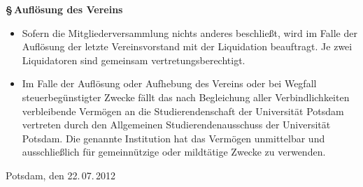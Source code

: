 \documentclass[11pt]{article}
\def\items#1{{%
  \itcounter0%
  \begin{itemize}
  #1
  \end{itemize}
}}
\let\it\item%
\def\item{
  \advance\itcounter1%
  \it[(\the\itcounter)]
}
\def\paragraf#1{
  \advance\itcounter1%
  \par\medskip
  {\large\bfseries \S\,\the\itcounter\quad#1}
  \par\smallskip
}
\begin{document}
\paragraf{Aufl{\"o}sung des Vereins}

\items{
   \item
     Sofern die Mitgliederversammlung nichts anderes beschlie{\ss}t, wird im Falle der Aufl{\"o}sung
     der letzte Vereinsvorstand mit der Liquidation beauftragt. Je zwei Liquidatoren sind
     gemeinsam vertretungsberechtigt.
   \item
     Im Falle der Aufl{\"o}sung oder Aufhebung des Vereins oder bei Wegfall steuerbeg{\"u}nstigter
     Zwecke f{\"a}llt das nach Begleichung aller Verbindlichkeiten verbleibende Verm{\"o}gen
     an die Studierendenschaft der Universit{\"a}t Potsdam vertreten durch
     den Allgemeinen Studierendenausschuss der Universit{\"a}t Potsdam.
     Die genannte Institution hat das Verm{\"o}gen unmittelbar und ausschlie{\ss}lich f{\"u}r
     gemeinn{\"u}tzige oder mildt{\"a}tige Zwecke zu verwenden.
}

\par\bigskip
Potsdam, den 22.\,07.\,2012
\end{document}
